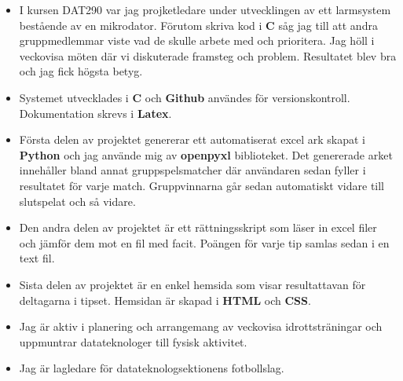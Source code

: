 \documentclass[10pt,a4paper,ragged2e]{altacv}
\begin{document}
\begin{fullwidth}

\begin{itemize}
  \item I kursen DAT290 var jag projketledare under utvecklingen av ett larmsystem 
  bestående av en mikrodator. Förutom skriva kod i \textbf{C} såg jag till att andra
  gruppmedlemmar viste vad de skulle arbete med och prioritera. Jag höll i veckovisa 
  möten där vi diskuterade framsteg och problem. Resultatet blev bra och jag fick 
  högsta betyg.
  \item Systemet utvecklades i \textbf{C} och \textbf{Github} användes för versionskontroll.
  Dokumentation skrevs i \textbf{Latex}.
\end{itemize}

\divider

\begin{itemize}
  \item Första delen av projektet genererar ett automatiserat excel ark skapat i \textbf{Python} 
  och jag använde mig av \textbf{openpyxl} biblioteket. Det genererade arket innehåller bland annat 
  gruppspelsmatcher där användaren sedan fyller i resultatet för varje match. Gruppvinnarna går sedan
  automatiskt vidare till slutspelat och så vidare.
  \item Den andra delen av projektet är ett rättningsskript som läser in excel filer och jämför 
  dem mot en fil med facit. Poängen för varje tip samlas sedan i en text fil.
  \item Sista delen av projektet är en enkel hemsida som visar resultattavan för deltagarna i tipset.
  Hemsidan är skapad i \textbf{HTML} och \textbf{CSS}.
\end{itemize}


\begin{itemize}
  \item Jag är aktiv i planering och arrangemang av veckovisa idrottsträningar och uppmuntrar
   datateknologer till fysisk aktivitet. 
  \item Jag är lagledare för datateknologsektionens fotbollslag.
\end{itemize}


\end{fullwidth}
\end{document}

